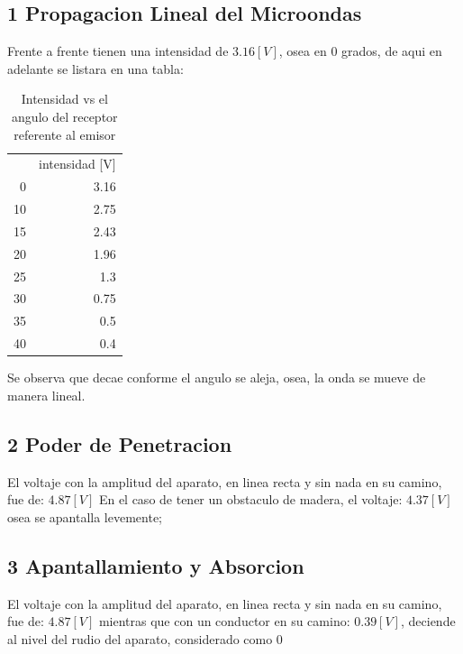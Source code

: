 \documentclass[a4paper,twocolumn,10pt]{article}
\begin{document}
\subsection*{1 Propagacion Lineal del Microondas}
Frente a frente tienen una intensidad de $3.16 [V]$, osea en $0$ grados, de aqui en adelante se listara en una tabla:
\begin{table}[H]
\centering
\caption{Intensidad vs el angulo del receptor referente al emisor}
\begin{tabular}{rr}
\rowcolor[rgb]{0.753,0.753,0.753} \multicolumn{1}{l}{angulo [grad]} & \multicolumn{1}{l}{intensidad [V]}  \\
0                                                                   & 3.16                                \\
10                                                                  & 2.75                                \\
15                                                                  & 2.43                                \\
20                                                                  & 1.96                                \\
25                                                                  & 1.3                                 \\
30                                                                  & 0.75                                \\
35                                                                  & 0.5                                 \\
40                                                                  & 0.4                                
\end{tabular}
\end{table}

Se observa que decae conforme el angulo se aleja, osea, la onda se mueve de manera lineal.

\subsection*{2 Poder de Penetracion}
El voltaje con la amplitud del aparato, en linea recta y sin nada en su camino, fue de: $4.87 [V]$
En el caso de tener un obstaculo de madera, el voltaje: $4.37 [V]$ osea se apantalla levemente;

\subsection*{3 Apantallamiento y Absorcion}
El voltaje con la amplitud del aparato, en linea recta y sin nada en su camino, fue de: $4.87 [V]$
mientras que con un conductor en su camino: $0.39 [V]$, deciende al nivel del rudio del aparato, considerado como 0
\end{document}
